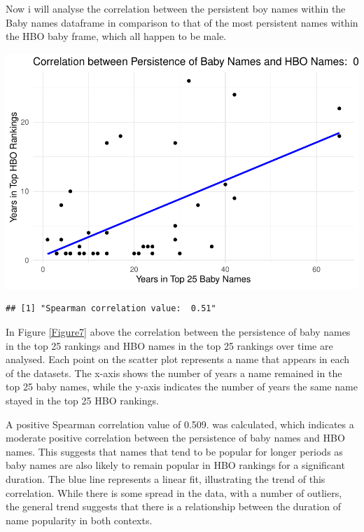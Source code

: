\documentclass[11pt,preprint, authoryear]{elsarticle}
\let\origfigure\figure
\let\endorigfigure\endfigure
\renewenvironment{figure}[1][2] {
    \expandafter\origfigure\expandafter[H]
} {
    \endorigfigure
}
\numberwithin{equation}{section}
\numberwithin{figure}{section}
\numberwithin{table}{section}
\begin{document}
Now i will analyse the correlation between the persistent boy names
within the Baby names dataframe in comparison to that of the most
persistent names within the HBO baby frame, which all happen to be male.

\begin{figure}

{\centering \includegraphics{README_files/figure-latex/unnamed-chunk-7-1} 

}

\caption{The Correlation Between the Persistence of HBO names and Baby Names.\label{Figure7}}\label{fig:unnamed-chunk-7}
\end{figure}

\begin{verbatim}
## [1] "Spearman correlation value:  0.51"
\end{verbatim}

In Figure \ref{Figure7} above the correlation between the persistence of
baby names in the top 25 rankings and HBO names in the top 25 rankings
over time are analysed. Each point on the scatter plot represents a name
that appears in each of the datasets. The x-axis shows the number of
years a name remained in the top 25 baby names, while the y-axis
indicates the number of years the same name stayed in the top 25 HBO
rankings.

A positive Spearman correlation value of 0.509. was calculated, which
indicates a moderate positive correlation between the persistence of
baby names and HBO names. This suggests that names that tend to be
popular for longer periods as baby names are also likely to remain
popular in HBO rankings for a significant duration. The blue line
represents a linear fit, illustrating the trend of this correlation.
While there is some spread in the data, with a number of outliers, the
general trend suggests that there is a relationship between the duration
of name popularity in both contexts.


\end{document}
